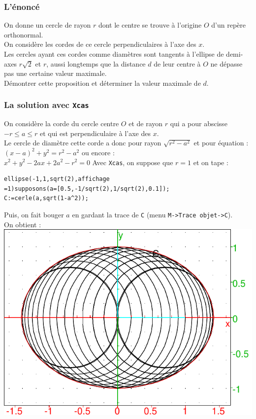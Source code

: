 \documentclass[a4paper,11pt]{book}
\begin{document}
\subsubsection{L'\'enonc\'e}
On donne un cercle de rayon $r$ dont le centre se trouve \`a l'origine $O$ d'un
rep\`ere orthonormal.\\
On consid\`ere les cordes de ce cercle perpendiculaires \`a l'axe des $x$.\\
Les cercles ayant  ces cordes comme diam\`etres sont 
tangents \`a l'ellipse de demi-axes $r\sqrt 2$ et $r$, aussi longtemps que la 
distance $d$ de leur centre \`a $O$ ne d\'epasse pas une certaine valeur 
maximale.\\
D\'emontrer cette proposition et d\'eterminer la valeur maximale de $d$.
\subsubsection{La solution avec {\tt Xcas}}
On consid\`ere la corde du cercle centre $O$ et de rayon $r$ qui a pour 
abscisse $-r\leq a\leq r$ et qui est perpendiculaire \`a l'axe des $x$.\\
Le cercle de diam\`etre cette corde a donc pour rayon 
$\sqrt{r^2-a^2}$ et pour \'equation :\\
$(x-a)^2+y^2=r^2-a^2$ ou encore :\\
$x^2+y^2-2ax+2a^2-r^2=0$
Avec {\tt Xcas}, on suppose que $r=1$ et on tape :
\begin{verbatim}
ellipse(-1,1,sqrt(2),affichage 
=1)supposons(a=[0.5,-1/sqrt(2),1/sqrt(2),0.1]);
C:=cerle(a,sqrt(1-a^2));
\end{verbatim}
Puis, on fait bouger $a$ en gardant la trace de {\tt C} (menu {\tt M->Trace objet->C}).\\
On obtient :\\
\includegraphics[width=\textwidth]{baceinst2}\\
\end{document}
